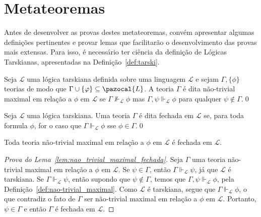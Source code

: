 

\section{Metateoremas}
    \label{sec:metateoremas}
    Antes de desenvolver as provas destes metateoremas, convém apresentar algumas definições pertinentes e provar lemas que facilitarão o desenvolvimento das provas mais extensas. Para isso, é necessário ter ciência da definição de Lógicas Tarskianas, apresentadas na Definição~\ref{def:tarski}.

    \begin{definicao}
        \label{def:nao-trivial_maximal}
        Seja $\mathcal{L}$ uma lógica tarskiana definida sobre uma linguagem $\mathcal{L}$ e sejam $\Gamma, \{\phi\}$ teorias de modo que $\Gamma \cup \{\phi\} \subseteq \pazocal{L}$. A teoria $\Gamma$ é dita não-trivial maximal em relação a $\phi$ em $\mathcal{L}$ se $\Gamma \nVdash_{\mathcal{L}} \phi$ mas $\Gamma, \psi \Vdash_{\mathcal{L}} \phi$ para qualquer $\psi \notin \Gamma$.\qed{}
    \end{definicao}


    \begin{definicao}
        \label{def:fechada}

        Seja $\mathcal{L}$ uma lógica tarskiana. Uma teoria $\Gamma$ é dita fechada em $\mathcal{L}$ se, para toda formula $\phi$, for o caso que $\Gamma \Vdash_{\mathcal{L}} \phi$ sse $\phi \in \Gamma$.\qed{}
    \end{definicao}

    \begin{lema}
        \label{lem:nao_trivial_maximal_fechada}
        Toda teoria não-trivial maximal em relação a $\phi$ em $\mathcal{L}$ é fechada em $\mathcal{L}$.
    \end{lema}

    \begin{proof}[Prova do Lema~\ref{lem:nao_trivial_maximal_fechada}]
        Seja $\Gamma$ uma teoria não-trivial maximal em relação a $\phi$ em $\mathcal{L}$. Se $\psi \in \Gamma$, então $\Gamma \Vdash_{\mathcal{L}} \psi$, já que $\mathcal{L}$ é tarskiana. Se $\Gamma \Vdash_{\mathcal{L}} \psi$, então supondo que $\psi \notin \Gamma$, temos que $\Gamma, \psi \Vdash_{\mathcal{L}} \phi$, pela Definição~\ref{def:nao-trivial_maximal}. Como $\mathcal{L}$ é tarskiana, segue que $\Gamma \Vdash_{\mathcal{L}} \phi$, o que contradiz o fato de $\Gamma$ ser não-trivial maximal em relação a $\phi$ em $\mathcal{L}$. Portanto, $\psi \in \Gamma$ e então $\Gamma$ é fechada em $\mathcal{L}$.
    \end{proof}

